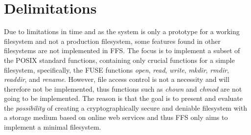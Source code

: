 \section{Delimitations} %
\label{sec:delim}

Due to limitations in time and as the system is only a prototype for a working filesystem and not a production filesystem, some features found in other filesystems are not implemented in \gls{FFS}. The focus is to implement a subset of the POSIX standard functions, containing only crucial functions for a simple filesystem, specifically, the \gls{FUSE} functions \textit{open}, \textit{read}, \textit{write}, \textit{mkdir}, \textit{rmdir}, \textit{readdir}, and \textit{rename}. However, file access control is not a necessity and will therefore not be implemented, thus functions such as \textit{chown} and \textit{chmod} are not going to be implemented. The reason is that the goal is to present and evaluate the \textit{possibility} of creating a cryptographically secure and deniable filesystem with a storage medium based on online web services and thus \gls{FFS} only aims to implement a minimal filesystem.